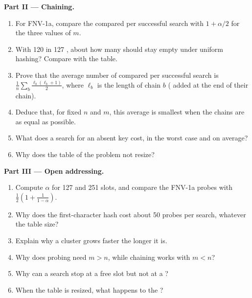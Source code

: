 \begin{problem}
\medskip\noindent\textbf{Part II --- Chaining.}
\begin{enumerate}[resume]
\item For FNV-1a, compare the  compared per successful search with $1 + \alpha/2$ for the three values of $m$.
\item With 120  in 127 , about how many  should stay empty under uniform hashing? Compare with the
table.
\item Prove that the average number of  compared per successful search is $\frac1n \sum_b \frac{\ell_b(\ell_b +
1)}{2}$, where $\ell_b$ is the length of chain $b$ ( added at the end of their chain).
\item Deduce that, for fixed $n$ and $m$, this average is smallest when the chains are as equal as possible.
\item What does a search for an absent key cost, in the worst case and on average?
\item Why does the table of the problem not resize?
\end{enumerate}

\medskip\noindent\textbf{Part III --- Open addressing.}
\begin{enumerate}[resume]
\item Compute $\alpha$ for 127 and 251 slots, and compare the FNV-1a probes with $\frac12(1 + \frac{1}{1 - \alpha})$.
\item Why does the first-character hash cost about 50 probes per search, whatever the table size?
\item Explain why a cluster grows faster the longer it is.
\item Why does probing need $m > n$, while chaining works with $m < n$?
\item Why can a search stop at a free slot but not at a ?
\item When the table is resized, what happens to the ?
\end{enumerate}


\end{problem}

